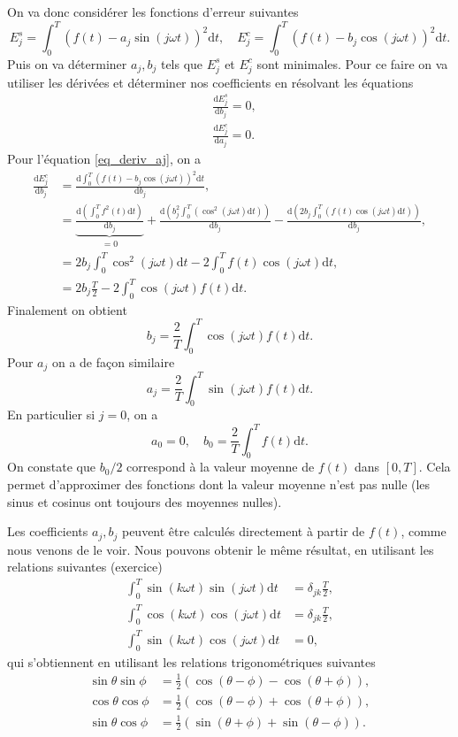 \documentclass[a4paper,12pt]{book}
\newcommand{\dd}{\mathrm{d}}
\newcommand{\dDeriv}[2]{\frac{\dd #1}{\dd #2}}
\renewcommand{\eqref}[1]{\ref{#1}}
\begin{document}
On va donc considérer les fonctions d'erreur suivantes
\begin{equation}
 E^s_j=\int_0^T(f(t)-a_j\sin(j\omega t))^2\dd t,\quad E^c_j=\int_0^T(f(t)-b_j\cos(j\omega t))^2\dd t.
\end{equation}
Puis on va déterminer $a_j,b_j$ tels que $E_j^s$ et $E_j^c$ sont minimales. Pour ce faire on va utiliser les dérivées
et déterminer nos coefficients en résolvant les équations
\begin{align}
 &\dDeriv{E^s_j}{b_j}=0,\label{eq_deriv_bj}\\
 &\dDeriv{E^c_j}{a_j}=0.\label{eq_deriv_aj}
\end{align}
Pour l'équation \eqref{eq_deriv_aj}, on a 
\begin{align}
 \dDeriv{E^c_j}{b_j}&=\dDeriv{\int_0^T(f(t)-b_j\cos(j\omega t))^2\dd t}{b_j},\nonumber\\
 &=\underbrace{\dDeriv{(\int_0^Tf^2(t)\dd t)}{b_j}}_{=0}+\dDeriv{(b_j^2\int_0^T(\cos^2(j\omega t)\dd t))}{b_j}-\dDeriv{(2b_j\int_0^T(f(t)\cos(j\omega t)\dd t))}{b_j},\nonumber\\
 &=2b_j\int_0^T\cos^2(j\omega t)\dd t-2\int_0^Tf(t)\cos(j\omega t)\dd t,\nonumber\\
 &=2b_j\frac{T}{2}-2\int_0^T\cos(j\omega t)f(t)\dd t.
\end{align}
Finalement on obtient
\begin{equation}
 b_j=\frac{2}{T}\int_0^T\cos(j\omega t)f(t)\dd t.
\end{equation}
Pour $a_j$ on a de façon similaire 
\begin{equation}
 a_j=\frac{2}{T}\int_0^T\sin(j\omega t)f(t)\dd t.
\end{equation}
En particulier si $j=0$, on a 
\begin{equation}
a_0=0,\quad b_0=\frac{2}{T}\int_0^T f(t)\dd t.
\end{equation}
On constate que $b_0/2$ correspond à la valeur moyenne de $f(t)$ dans $[0,T]$. Cela 
permet d'approximer des fonctions dont la valeur moyenne n'est pas nulle (les sinus et cosinus ont toujours
des moyennes nulles).

Les coefficients $a_j,b_j$ peuvent être calculés directement à partir de $f(t)$,
comme nous venons de le voir. Nous pouvons obtenir le même résultat, en utilisant les relations suivantes (exercice)
\begin{align}
 \int_0^T \sin(k \omega t)\sin(j \omega t)\dd t&=\delta_{jk} \frac{T}{2},\\
 \int_0^T \cos(k \omega t)\cos(j \omega t)\dd t&=\delta_{jk} \frac{T}{2},\\
 \int_0^T \sin(k \omega t)\cos(j \omega t)\dd t&=0,
\end{align}
qui s'obtiennent en utilisant les relations trigonométriques suivantes
\begin{align}
 \sin\theta\sin\phi&= \frac{1}{2}\left(\cos(\theta-\phi)-\cos(\theta+\phi)\right),\\
 \cos\theta\cos\phi&= \frac{1}{2}\left(\cos(\theta-\phi)+\cos(\theta+\phi)\right),\\
 \sin\theta\cos\phi&= \frac{1}{2}\left(\sin(\theta+\phi)+\sin(\theta-\phi)\right).
\end{align}
\end{document}
